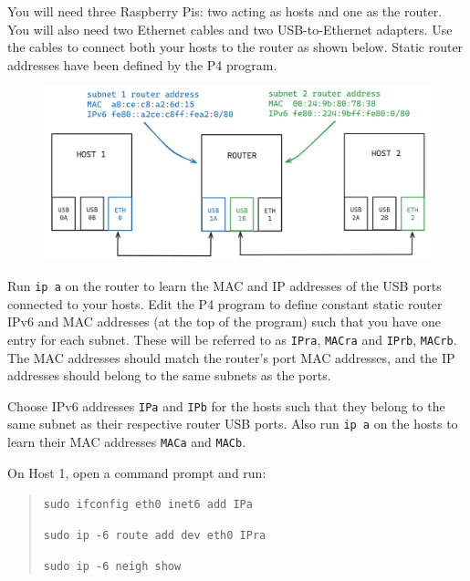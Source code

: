 



You will need three Raspberry Pis: two acting as hosts and one as the router. You will also need two Ethernet cables and two USB-to-Ethernet adapters. Use the cables to connect both your hosts to the router as shown below. Static router addresses have been defined by the P4 program.

\begin{figure}[htbp]
  \centering
    \includegraphics[width=1\textwidth]{figures/appendices/icmpv6_ndp_setup.jpg}
\end{figure}

Run \texttt{ip a} on the router to learn the MAC and IP addresses of the USB ports connected to your hosts. Edit the P4 program to define constant static router IPv6 and MAC addresses (at the top of the program) such that you have one entry for each subnet. These will be referred to as \texttt{IPra}, \texttt{MACra} and \texttt{IPrb}, \texttt{MACrb}. The MAC addresses should match the router’s port MAC addresses, and the IP addresses should belong to the same subnets as the ports. 

Choose IPv6 addresses \texttt{IPa} and \texttt{IPb} for the hosts such that they belong to the same subnet as their respective router USB ports. Also run \texttt{ip a} on the hosts to learn their MAC addresses \texttt{MACa} and \texttt{MACb}.

On Host 1, open a command prompt and run:
\begin{quote}
    \texttt{sudo ifconfig eth0 inet6 add IPa}
    
    \texttt{sudo ip -6 route add dev eth0 IPra}
    
    \texttt{sudo ip -6 neigh show}
\end{quote}

